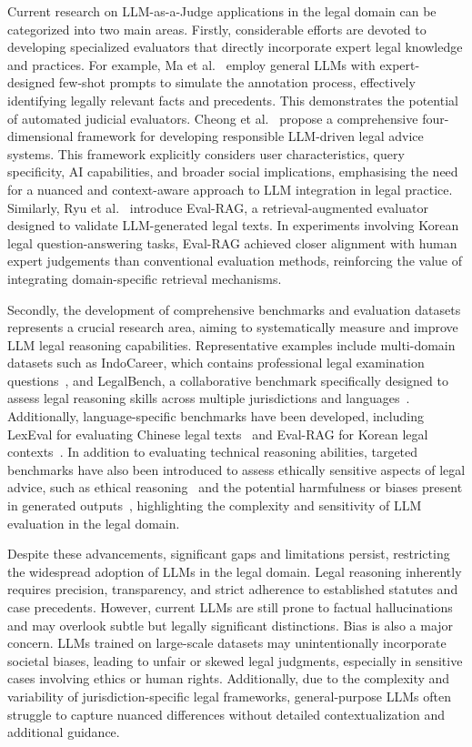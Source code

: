 \documentclass[acmsmall,screen]{acmart}
\begin{document}
Current research on LLM-as-a-Judge applications in the legal domain can be categorized into two main areas. Firstly, considerable efforts are devoted to developing specialized evaluators that directly incorporate expert legal knowledge and practices. For example, Ma et al.~\cite{ma2024leveraginglargelanguagemodels} employ general LLMs with expert-designed few-shot prompts to simulate the annotation process, effectively identifying legally relevant facts and precedents. This demonstrates the potential of automated judicial evaluators. Cheong et al.~\cite{cheong2024not} propose a comprehensive four-dimensional framework for developing responsible LLM-driven legal advice systems. This framework explicitly considers user characteristics, query specificity, AI capabilities, and broader social implications, emphasising the need for a nuanced and context-aware approach to LLM integration in legal practice. Similarly, Ryu et al.~\cite{ryu2023retrieval} introduce Eval-RAG, a retrieval-augmented evaluator designed to validate LLM-generated legal texts. In experiments involving Korean legal question-answering tasks, Eval-RAG achieved closer alignment with human expert judgements than conventional evaluation methods, reinforcing the value of integrating domain-specific retrieval mechanisms.

Secondly, the development of comprehensive benchmarks and evaluation datasets represents a crucial research area, aiming to systematically measure and improve LLM legal reasoning capabilities. Representative examples include multi-domain datasets such as IndoCareer, which contains professional legal examination questions~\cite{koto2024cracking}, and LegalBench, a collaborative benchmark specifically designed to assess legal reasoning skills across multiple jurisdictions and languages~\cite{guha2024legalbench}. Additionally, language-specific benchmarks have been developed, including LexEval for evaluating Chinese legal texts~\cite{li2024lexeval} and Eval-RAG for Korean legal contexts~\cite{ryu2023retrieval}. In addition to evaluating technical reasoning abilities, targeted benchmarks have also been introduced to assess ethically sensitive aspects of legal advice, such as ethical reasoning~\cite{zhang2024evaluation} and the potential harmfulness or biases present in generated outputs~\cite{andriushchenko2024agentharm}, highlighting the complexity and sensitivity of LLM evaluation in the legal domain.

Despite these advancements, significant gaps and limitations persist, restricting the widespread adoption of LLMs in the legal domain. Legal reasoning inherently requires precision, transparency, and strict adherence to established statutes and case precedents. However, current LLMs are still prone to factual hallucinations and may overlook subtle but legally significant distinctions. Bias is also a major concern. LLMs trained on large-scale datasets may unintentionally incorporate societal biases, leading to unfair or skewed legal judgments, especially in sensitive cases involving ethics or human rights. Additionally, due to the complexity and variability of jurisdiction-specific legal frameworks, general-purpose LLMs often struggle to capture nuanced differences without detailed contextualization and additional guidance.
\end{document}
